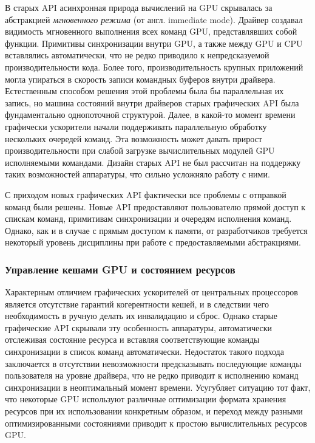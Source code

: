 В старых API асинхронная природа вычислений на GPU скрывалась за абстракцией \textit{мгновенного режима} (от англ. immediate mode).
Драйвер создавал видимость мгновенного выполнения всех команд GPU, представлявших собой функции. Примитивы синхронизации внутри GPU, а также между GPU и CPU вставлялись автоматически, что не редко приводило к непредсказуемой производительности кода. Более того, производительность крупных приложений могла упираться в скорость записи командных буферов внутри драйвера. Естественным способом решения этой проблемы была бы параллельная их запись, но машина состояний внутри драйверов старых графических API была фундаментально однопоточной структурой. Далее, в какой-то момент времени графически ускорители начали поддерживать параллельную обработку нескольких очередей команд. Эта возможность может давать прирост производительности при слабой загрузке вычислительных модулей GPU исполняемыми командами. Дизайн старых API не был рассчитан на поддержку таких возможностей аппаратуры, что сильно усложняло работу с ними.

С приходом новых графических API фактически все проблемы с отправкой команд были решены. Новые API предоставляют пользователю прямой доступ к спискам команд, примитивам синхронизации и очередям исполнения команд. Однако, как и в случае с прямым доступом к памяти, от разработчиков требуется некоторый уровень дисциплины при работе с предоставляемыми абстракциями.

\subsubsection*{Управление кешами GPU и состоянием ресурсов}
Характерным отличием графических ускорителей от центральных процессоров является отсутствие гарантий когерентности кешей, и в следствии чего необходимость в ручную делать их инвалидацию и сброс. Однако старые графические API скрывали эту особенность аппаратуры, автоматически отслеживая состояние ресурса и вставляя соответствующие команды синхронизации в список команд автоматически. Недостаток такого подхода заключается в отсутствии невозможности предсказывать последующие команды пользователя на уровне драйвера, что не редко приводит к исполнению команд синхронизации в неоптимальный момент времени. Усугубляет ситуацию тот факт, что некоторые GPU используют различные оптимизации формата хранения ресурсов при их использовании конкретным образом, и переход между разными оптимизированными состояниями приводит к простою вычислительных ресурсов GPU.

